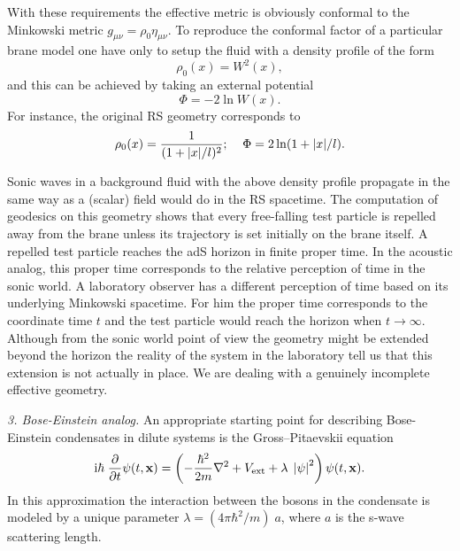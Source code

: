 \documentclass[a4paper,prl,showpacs,twocolumn]{revtex4}
\begin{document}
With these requirements the effective metric is obviously  
conformal to the Minkowski metric $g_{\mu\nu} = \rho_0 \eta_{\mu\nu}$.
To reproduce the conformal factor of a particular brane model one have only
to setup the fluid with a density profile of the form
%
\begin{equation}  
\rho_0(x)=W^2(x),
\label{density-profile}
\end{equation}
%
and this can be achieved by taking an external potential 
%
\begin{equation} 
\Phi=-2\ln W(x).
\label{external-potential}
\end{equation}
%
For instance, the original RS geometry corresponds to
%
\begin{equation}  
\rho_0(x)={1 \over (1+|x|/l)^2}; \;\;\;\; \Phi=2\ln(1+|x|/l).
\end{equation}
%



Sonic waves in a background fluid with the above density profile
propagate in the same way as a (scalar) field would do in the RS
spacetime. 
The computation of geodesics on this geometry 
\cite{MucVisVol:2000}
shows that every free-falling test particle is repelled away from the
brane unless its trajectory is set initially on the brane itself.  A
repelled test particle reaches the adS horizon in finite
proper time. In the acoustic analog, this proper time corresponds
to the relative perception of time in the sonic world. 
A laboratory observer has a different perception of time based on
its underlying Minkowski spacetime. For him the proper time corresponds
to the coordinate time $t$ and the test particle would reach
the horizon when $t \rightarrow \infty$. Although from the 
sonic world point of view the geometry might be extended beyond
the horizon the reality of the system in the laboratory tell us 
that this extension is not actually in place. We are dealing with 
a genuinely incomplete effective geometry. 






\noindent
{\it 3. Bose-Einstein analog.}
An appropriate starting point for describing Bose-Einstein condensates 
in dilute systems is the Gross--Pitaevskii equation 
\cite{dalfovo}
%
\[
\label{E:tdlg}
 {\rm i} \hbar \; \frac{\partial }{\partial t} \psi(t,{\mathbf x})= \left (
 - {\hbar^2\over2m}\nabla^2 
 + V_{\rm ext}
 + \lambda \; \left| \psi \right|^2 \right) \psi(t,{\mathbf x}).
\label{eq:GP}
\]
%
In this approximation the interaction between the bosons in the 
condensate is modeled by a unique parameter 
$\lambda = (4\pi  \hbar^2 / m)\;a$, where $a$ is the s-wave scattering length.
\end{document}
